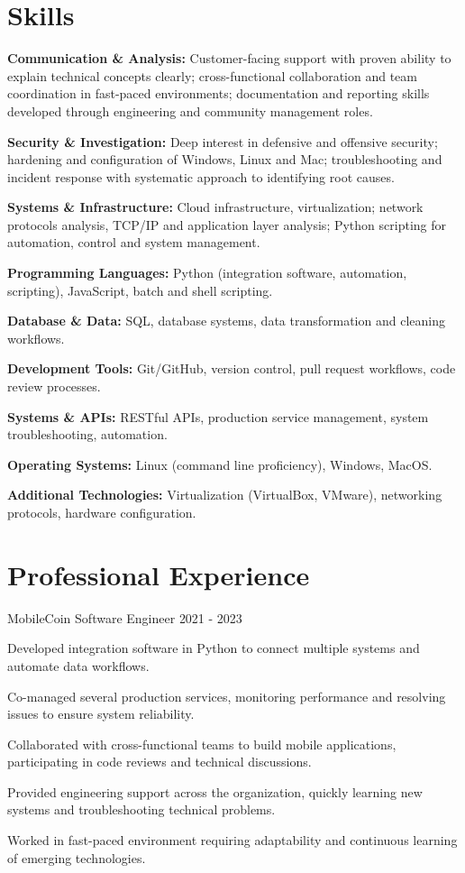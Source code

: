 \documentclass{../styles/cv}
\begin{document}
\populatedtitle

\section{Skills}
\resumesublistbegin
    \item \textbf{Communication \& Analysis:} Customer-facing support with proven ability to explain technical concepts clearly; cross-functional collaboration and team coordination in fast-paced environments; documentation and reporting skills developed through engineering and community management roles.
    \item \textbf{Security \& Investigation:} Deep interest in defensive and offensive security; hardening and configuration of Windows, Linux and Mac; troubleshooting and incident response with systematic approach to identifying root causes.
    \item \textbf{Systems \& Infrastructure:} Cloud infrastructure, virtualization; network protocols analysis, TCP/IP and application layer analysis; Python scripting for automation, control and system management.
    \item \textbf{Programming Languages:} Python (integration software, automation, scripting), JavaScript, batch and shell scripting.
    \item \textbf{Database \& Data:} SQL, database systems, data transformation and cleaning workflows.
    \item \textbf{Development Tools:} Git/GitHub, version control, pull request workflows, code review processes.
    \item \textbf{Systems \& APIs:} RESTful APIs, production service management, system troubleshooting, automation.
    \item \textbf{Operating Systems:} Linux (command line proficiency), Windows, MacOS.
    \item \textbf{Additional Technologies:} Virtualization (VirtualBox, VMware), networking protocols, hardware configuration.
\resumesublistend

\section{Professional Experience}

\subsectionpositiondate
    {MobileCoin}
    {Software Engineer}
    {2021 - 2023}
\resumesublistbegin
    \item Developed integration software in Python to connect multiple systems and automate data workflows.
    \item Co-managed several production services, monitoring performance and resolving issues to ensure system reliability.
    \item Collaborated with cross-functional teams to build mobile applications, participating in code reviews and technical discussions.
    \item Provided engineering support across the organization, quickly learning new systems and troubleshooting technical problems.
    \item Worked in fast-paced environment requiring adaptability and continuous learning of emerging technologies.
\resumesublistend
\end{document}
